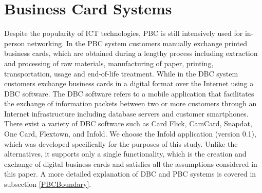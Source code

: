 \documentclass[3p,times,procedia]{elsarticle}
\begin{document}
\section{Business Card Systems}

Despite the popularity of ICT technologies, PBC is still intensively used for in-person networking. In the PBC system customers manually exchange printed business cards, which are obtained during a lengthy process including extraction and processing of raw materials, manufacturing of paper, printing, transportation, usage and end-of-life treatment. While in the DBC system customers exchange business cards in a digital format over the Internet using a DBC software. The DBC software refers to a mobile application that facilitates the exchange of information packets between two or more customers through an Internet infrastructure including database servers and customer smartphones. There exist a variety of DBC software such as Card Flick, CamCard, Snapdat, One Card, Flextown, and Infold. We choose the Infold application (version 0.1), which was developed specifically for the purposes of this study. Unlike the alternatives, it supports only a single functionality, which is the creation and exchange of digital business cards and satisfies all the assumptions considered in this paper. A more detailed explanation of DBC and PBC systems is covered in subsection \ref{PBCBoundary}.
\end{document}
